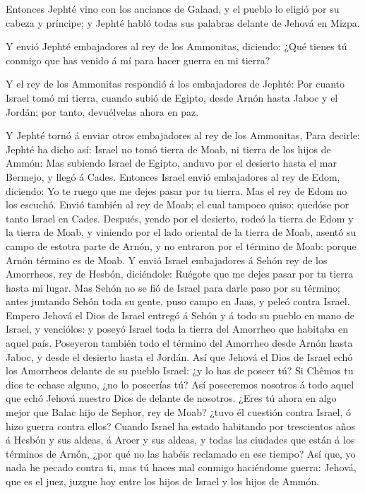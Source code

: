  Entonces Jephté vino con los ancianos de Galaad, y el
pueblo lo eligió por su cabeza y príncipe; y Jephté habló todas sus
palabras delante de Jehová en Mizpa.

 Y envió Jephté embajadores al rey de los Ammonitas,
diciendo: ¿Qué tienes tú conmigo que has venido á mí para hacer guerra
en mi tierra?

 Y el rey de los Ammonitas respondió á los embajadores de
Jephté: Por cuanto Israel tomó mi tierra, cuando subió de Egipto, desde
Arnón hasta Jaboc y el Jordán; por tanto, devuélvelas ahora en paz.

 Y Jephté tornó á enviar otros embajadores al rey de los
Ammonitas,  Para decirle: Jephté ha dicho así: Israel no
tomó tierra de Moab, ni tierra de los hijos de Ammón:  Mas
subiendo Israel de Egipto, anduvo por el desierto hasta el mar Bermejo,
y llegó á Cades.  Entonces Israel envió embajadores al rey
de Edom, diciendo: Yo te ruego que me dejes pasar por tu tierra. Mas el
rey de Edom no los escuchó. Envió también al rey de Moab; el cual
tampoco quiso: quedóse por tanto Israel en Cades.  Después,
yendo por el desierto, rodeó la tierra de Edom y la tierra de Moab, y
viniendo por el lado oriental de la tierra de Moab, asentó su campo de
estotra parte de Arnón, y no entraron por el término de Moab: porque
Arnón término es de Moab.  Y envió Israel embajadores á
Sehón rey de los Amorrheos, rey de Hesbón, diciéndole: Ruégote que me
dejes pasar por tu tierra hasta mi lugar.  Mas Sehón no se
fió de Israel para darle paso por su término; antes juntando Sehón toda
su gente, puso campo en Jaas, y peleó contra Israel. 
Empero Jehová el Dios de Israel entregó á Sehón y á todo su pueblo en
mano de Israel, y venciólos: y poseyó Israel toda la tierra del Amorrheo
que habitaba en aquel país.  Poseyeron también todo el
término del Amorrheo desde Arnón hasta Jaboc, y desde el desierto hasta
el Jordán.  Así que Jehová el Dios de Israel echó los
Amorrheos delante de su pueblo Israel: ¿y lo has de poseer tú?
 Si Chêmos tu dios te echase alguno, ¿no lo poseerías tú?
Así poseeremos nosotros á todo aquel que echó Jehová nuestro Dios de
delante de nosotros.  ¿Eres tú ahora en algo mejor que
Balac hijo de Sephor, rey de Moab? ¿tuvo él cuestión contra Israel, ó
hizo guerra contra ellos?  Cuando Israel ha estado
habitando por trescientos años á Hesbón y sus aldeas, á Aroer y sus
aldeas, y todas las ciudades que están á los términos de Arnón, ¿por qué
no las habéis reclamado en ese tiempo?  Así que, yo nada he
pecado contra ti, mas tú haces mal conmigo haciéndome guerra: Jehová,
que es el juez, juzgue hoy entre los hijos de Israel y los hijos de
Ammón.

